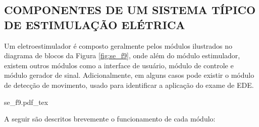 \subsection{COMPONENTES DE UM SISTEMA TÍPICO DE ESTIMULAÇÃO ELÉTRICA}
Um eletroestimulador é composto geralmente pelos módulos ilustrados no diagrama de blocos da Figura \ref{fig:se_f9}, onde além do módulo estimulador, existem outros módulos como a interface de usuário, módulo de controle e módulo gerador de sinal. Adicionalmente, em alguns casos pode existir o módulo de detecção de movimento, usado para identificar a aplicação do exame de \acrshort{EDE}. 

\begin{figure*}[h]
    \centering %
    \small %
    \def\svgwidth{1.3\columnwidth}%
    \fontsize{10pt}{11pt}\selectfont%
    \def\svgwidth{4in}
    {se_f9.pdf_tex}
    \caption{Diagrama de blocos geral de um dispositivo de estimulação elétrica.}
    \label{fig:se_f9}
\end{figure*}

A seguir são descritos brevemente o funcionamento de cada módulo:

